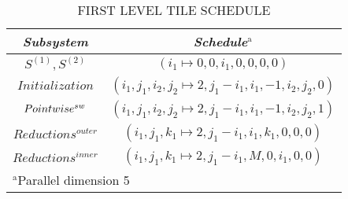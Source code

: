 \begin{table}[htbp]
\caption{\uppercase{First Level Tile Schedule}}
\begin{center}
\begin{tabular}{|c|c|}
\hline
\textbf{\textit{Subsystem}}& \textbf{\textit{Schedule}}$^{\mathrm{a}}$ \\
\hline
$S^{(1)}, S^{(2)}$ & $(i_{1} \mapsto 0, 0, i_{1}, 0, 0, 0, 0)$   \\
\cline{1-2} 
$Initialization$ & $(i_{1},j_{1},i_{2},j_{2} \mapsto 2, j_{1}-i_{1}, i_{1}, -1, i_{2}, j_{2},0)$   \\
\cline{1-2} 
$Point\-wise^{sw}$ & $(i_{1},j_{1},i_{2},j_{2} \mapsto 2, j_{1}-i_{1}, i_{1}, -1, i_{2}, j_{2},1)$   \\
\cline{1-2}
$Reductions^{outer}$ & $(i_{1},j_{1},k_{1} \mapsto 2, j_{1}-i_{1}, i_{1}, k_{1}, 0, 0, 0)$    \\
\cline{1-2}
$Reductions^{inner}$ & $(i_{1},j_{1},k_{1} \mapsto 2, j_{1}-i_{1}, M, 0, i_{1}, 0, 0)$    \\
 \cline{1-2} 
\hline
\multicolumn{2}{l}{$^{\mathrm{a}}$Parallel dimension 5}
\end{tabular}
\label{tab:tile_l1}
\end{center}
\end{table}